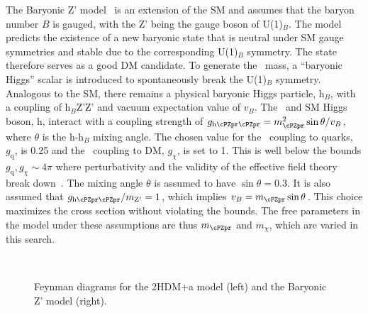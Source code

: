 The Baryonic Z' model~\cite{PhysRevD.89.075017} is an extension of the SM and 
assumes that the baryon number $B$ is gauged, with the Z' being the gauge 
boson of U(1)$_{B}$. The model predicts the existence of a new baryonic state that is neutral under SM gauge symmetries and stable due to the corresponding U(1)$_{B}$ symmetry. The state therefore serves as a good DM candidate.
To generate the  \cPZpr\ mass, a ``baryonic Higgs'' scalar is introduced to 
spontaneously break the U(1)$_B$ symmetry. Analogous to the SM, there remains 
a physical baryonic Higgs particle, h$_{B}$, with a coupling of h$_{B}$Z'Z' 
and vacuum expectation value of $v_{B}$. 
The \cPZpr\ and SM Higgs boson, h, interact with a coupling strength of 
$g_{\text{h}\cPZpr\cPZpr} = m_{\cPZpr}^{2} \sin \theta/v_{B}$, where $\theta$ is the h-h$_{B}$ 
mixing angle. The chosen value for the \cPZpr\ coupling to quarks,
$g_\text{q}$, is 0.25 and the \cPZpr\ coupling to DM, $g_\chi$, is set to 1. This is well below the bounds $g_\text{q},g_\chi\sim4\pi$ where perturbativity and the validity of the effective field theory break down~\cite{PhysRevD.89.075017}. The mixing angle $\theta$ is assumed to have $\sin\theta= 0.3$. It is also assumed that $g_{\text{h}\cPZpr\cPZpr}/m_{\mathrm{Z}'}=1$, which implies $v_B=m_{\cPZpr}\sin\theta$. This choice maximizes the cross section without violating the bounds. The free parameters in the model under these assumptions are thus $m_{\cPZpr}$ and $m_\chi$, which are varied in this search.

\begin{figure}
\centering
 \hspace{1cm}
  \\
\caption{Feynman diagrams for the 2HDM+a model (left) and the Baryonic Z' model (right).}
\label{feyns}
\end{figure}


